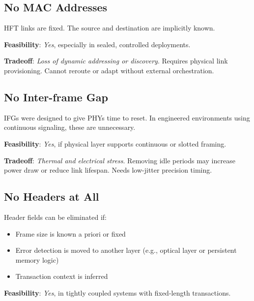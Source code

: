 \documentclass[HFT-main.tex]{subfiles} %
\begin{document}
\subsection*{No MAC Addresses}

HFT links are fixed. The source and destination are implicitly known.


\textbf{Feasibility}: \emph{Yes}, especially in sealed, controlled deployments.

\textbf{Tradeoff}: \emph{Loss of dynamic addressing or discovery}. Requires physical link provisioning. Cannot reroute or adapt without external orchestration.

\subsection*{No Inter-frame Gap}

IFGs were designed to give PHYs time to reset. In engineered environments using continuous signaling, these are unnecessary.


\textbf{Feasibility}: \emph{Yes}, if physical layer supports continuous or slotted framing.

\textbf{Tradeoff}: \emph{Thermal and electrical stress}. Removing idle periods may increase power draw or reduce link lifespan. Needs low-jitter precision timing.

\subsection*{No Headers at All}

Header fields can be eliminated if:
\begin{itemize}
  \item Frame size is known a priori or fixed
  \item Error detection is moved to another layer (e.g., optical layer or persistent memory logic)
  \item Transaction context is inferred
\end{itemize}

\textbf{Feasibility}: \emph{Yes}, in tightly coupled systems with fixed-length transactions.

\end{document}
